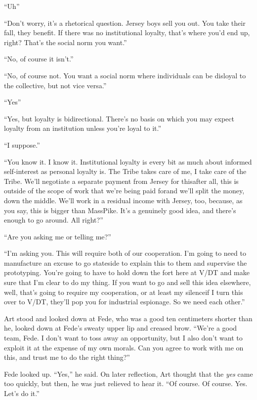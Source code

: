 “Uh{\dash}”

“Don’t worry, it’s a rhetorical question. Jersey boys sell you out.
You take their fall, they benefit. If there was no institutional
loyalty, that’s where you’d end up, right? That’s the social norm
you want.”

“No, of course it isn’t.”

“No, of course not. You want a social norm where individuals can be
disloyal to the collective, but not vice versa.”

“Yes{\dash}”

“Yes, but loyalty is bidirectional. There’s no basis on which you
may expect loyalty from an institution unless you’re loyal to it.”

“I suppose.”

“You know it. I know it. Institutional loyalty is every bit as much
about informed self-interest as personal loyalty is. The Tribe
takes care of me, I take care of the Tribe. We’ll negotiate a
separate payment from Jersey for this{\dash}after all, this is outside of
the scope of work that we’re being paid for{\dash}and we’ll split the
money, down the middle. We’ll work in a residual income with
Jersey, too, because, as you say, this is bigger than MassPike.
It’s a genuinely good idea, and there’s enough to go around. All
right?”

“Are you asking me or telling me?”

“I’m asking you. This will require both of our cooperation. I’m
going to need to manufacture an excuse to go stateside to explain
this to them and supervise the prototyping. You’re going to have to
hold down the fort here at V/DT and make sure that I’m clear to do
my thing. If you want to go and sell this idea elsewhere, well,
that’s going to require my cooperation, or at least my silence{\dash}if I
turn this over to V/DT, they’ll pop you for industrial espionage.
So we need each other.”

Art stood and looked down at Fede, who was a good ten centimeters
shorter than he, looked down at Fede’s sweaty upper lip and creased
brow. “We’re a good team, Fede. I don’t want to toss away an
opportunity, but I also don’t want to exploit it at the expense of
my own morals. Can you agree to work with me on this, and trust me
to do the right thing?”

Fede looked up. “Yes,” he said. On later reflection, Art thought
that the \emph{yes} came too quickly, but then, he was just
relieved to hear it. “Of course. Of course. Yes. Let’s do it.”

